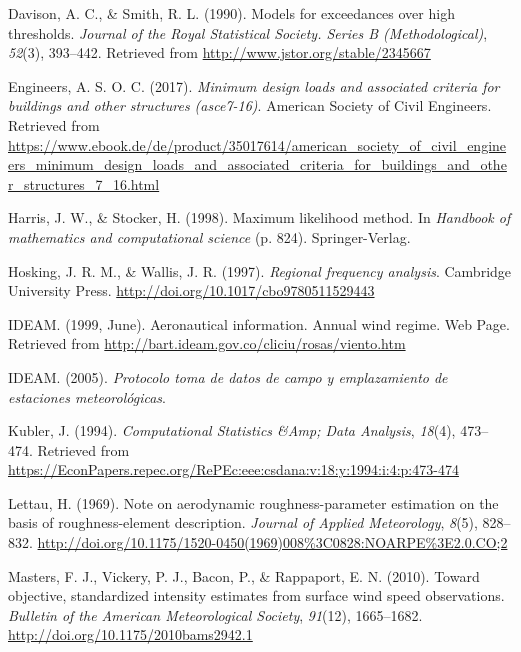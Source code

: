 \documentclass[12pt,oneside]{reedthesis}
\begin{document}
\leavevmode\hypertarget{ref-Davison1990}{}%
Davison, A. C., \& Smith, R. L. (1990). Models for exceedances over high thresholds. \emph{Journal of the Royal Statistical Society. Series B (Methodological)}, \emph{52}(3), 393--442. Retrieved from \url{http://www.jstor.org/stable/2345667}

\leavevmode\hypertarget{ref-Asce2017}{}%
Engineers, A. S. O. C. (2017). \emph{Minimum design loads and associated criteria for buildings and other structures (asce7-16)}. American Society of Civil Engineers. Retrieved from \url{https://www.ebook.de/de/product/35017614/american_society_of_civil_engineers_minimum_design_loads_and_associated_criteria_for_buildings_and_other_structures_7_16.html}

\leavevmode\hypertarget{ref-Harris1994}{}%
Harris, J. W., \& Stocker, H. (1998). Maximum likelihood method. In \emph{Handbook of mathematics and computational science} (p. 824). Springer-Verlag.

\leavevmode\hypertarget{ref-Hosking1997}{}%
Hosking, J. R. M., \& Wallis, J. R. (1997). \emph{Regional frequency analysis}. Cambridge University Press. \url{http://doi.org/10.1017/cbo9780511529443}

\leavevmode\hypertarget{ref-ideam1999}{}%
IDEAM. (1999, June). Aeronautical information. Annual wind regime. Web Page. Retrieved from \url{http://bart.ideam.gov.co/cliciu/rosas/viento.htm}

\leavevmode\hypertarget{ref-ideam2005}{}%
IDEAM. (2005). \emph{Protocolo toma de datos de campo y emplazamiento de estaciones meteorológicas}.

\leavevmode\hypertarget{ref-Kubler1994}{}%
Kubler, J. (1994). \emph{Computational Statistics \&Amp; Data Analysis}, \emph{18}(4), 473--474. Retrieved from \url{https://EconPapers.repec.org/RePEc:eee:csdana:v:18:y:1994:i:4:p:473-474}

\leavevmode\hypertarget{ref-Lettau1969}{}%
Lettau, H. (1969). Note on aerodynamic roughness-parameter estimation on the basis of roughness-element description. \emph{Journal of Applied Meteorology}, \emph{8}(5), 828--832. \url{http://doi.org/10.1175/1520-0450(1969)008\%3C0828:NOARPE\%3E2.0.CO;2}

\leavevmode\hypertarget{ref-Masters2010}{}%
Masters, F. J., Vickery, P. J., Bacon, P., \& Rappaport, E. N. (2010). Toward objective, standardized intensity estimates from surface wind speed observations. \emph{Bulletin of the American Meteorological Society}, \emph{91}(12), 1665--1682. \url{http://doi.org/10.1175/2010bams2942.1}
\end{document}
